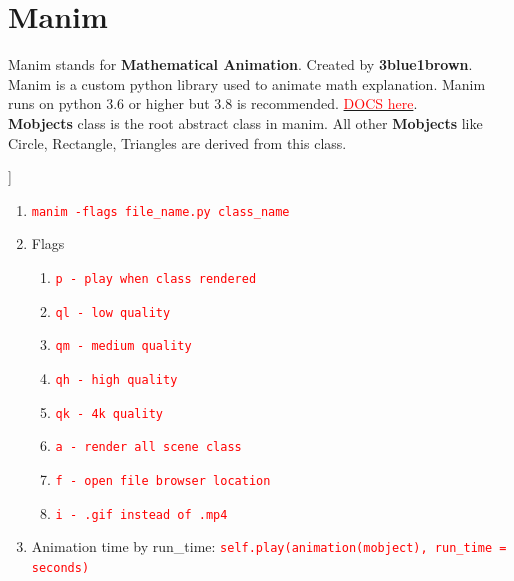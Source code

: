 \documentclass[12 pt, letterpaper]{extarticle}
\newcommand{\R}{\textcolor{red}} %
\newcommand{\T}{\texttt}
\begin{document}
\section*{Manim}
Manim stands for \textbf{Mathematical Animation}. Created by \textbf{3blue1brown}. Manim is a custom python library used to animate math explanation. Manim runs on python 3.6 or higher but 3.8 is recommended. \href{https://docs.manim.community/en/stable/}{\textcolor{red}{DOCS here}}.\\
\textbf{Mobjects} class is the root abstract class in manim. All other \textbf{Mobjects} like Circle, Rectangle, Triangles are derived from this class.\\

\begin{center}
\begin{forest}
	[Mobject
		[Circle]
		[Rectangle]
		[Triangle]
		[Arrow]
		[Axes]
		[FunctionGraph]
		[Barchart]
	]
\end{forest}
\end{center}

\begin{enumerate}
	\item \R{\T{manim -flags file\_name.py class\_name}}
	\item Flags
			  \begin{enumerate}
			  	\item \R{\T{p - play when class rendered}}
			  	\item \R{\T{ql - low quality}}
			  	\item \R{\T{qm - medium quality}}
			  	\item \R{\T{qh - high quality}}
			  	\item \R{\T{qk - 4k quality}}
			  	\item \R{\T{a - render all scene class}}
			  	\item \R{\T{f - open file browser location}}
			  	\item \R{\T{i - .gif instead of .mp4}}
			  \end{enumerate}
	\item Animation time by run\_time: \R{\T{self.play(animation(mobject), run\_time = seconds)}}
\end{enumerate}
\end{document}
